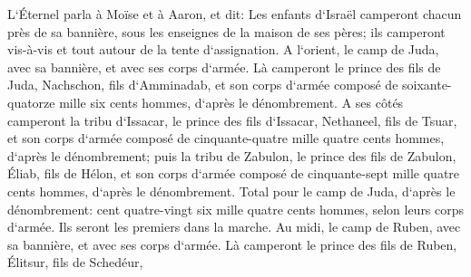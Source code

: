 \verse L`Éternel parla à Moïse et à Aaron, et dit: 
\verse Les enfants d`Israël camperont chacun près de sa bannière, sous les enseignes de la maison de ses pères; ils camperont vis-à-vis et tout autour de la tente d`assignation. 
\verse A l`orient, le camp de Juda, avec sa bannière, et avec ses corps d`armée. Là camperont le prince des fils de Juda, Nachschon, fils d`Amminadab, 
\verse et son corps d`armée composé de soixante-quatorze mille six cents hommes, d`après le dénombrement. 
\verse A ses côtés camperont la tribu d`Issacar, le prince des fils d`Issacar, Nethaneel, fils de Tsuar, 
\verse et son corps d`armée composé de cinquante-quatre mille quatre cents hommes, d`après le dénombrement; 
\verse puis la tribu de Zabulon, le prince des fils de Zabulon, Éliab, fils de Hélon, 
\verse et son corps d`armée composé de cinquante-sept mille quatre cents hommes, d`après le dénombrement. 
\verse Total pour le camp de Juda, d`après le dénombrement: cent quatre-vingt six mille quatre cents hommes, selon leurs corps d`armée. Ils seront les premiers dans la marche. 
\verse Au midi, le camp de Ruben, avec sa bannière, et avec ses corps d`armée. Là camperont le prince des fils de Ruben, Élitsur, fils de Schedéur, 
